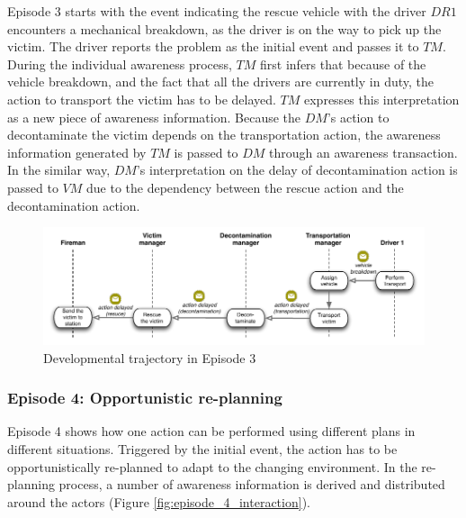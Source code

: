 Episode 3 starts with the event indicating the rescue vehicle with the driver $DR1$ encounters a mechanical breakdown, as the driver is on the way to pick up the victim. The driver reports the problem as the initial event and passes it to $TM$. During the individual awareness process, $TM$ first infers that because of the vehicle breakdown, and the fact that all the drivers are currently in duty, the action to transport the victim has to be delayed. $TM$ expresses this interpretation as a new piece of awareness information. Because the $DM$'s action to decontaminate the victim depends on the transportation action, the awareness information generated by $TM$ is passed to $DM$ through an awareness transaction. In the similar way, $DM$'s interpretation on the delay of decontamination action is passed to $VM$ due to the dependency between the rescue action and the decontamination action. 

\begin{figure}[htbp] %
   \centering
   \includegraphics[width=5.8in]{episode_3_interaction.pdf} 
   \caption{Developmental trajectory in Episode 3}
   \label{fig:episode_3_interaction}
\end{figure}

\subsubsection{Episode 4: Opportunistic re-planning} %
\label{ssub:episode_4_opportunistic_re_planning}
Episode 4 shows how one action can be performed using different plans in different situations. Triggered by the initial event, the action has to be opportunistically re-planned to adapt to the changing environment. In the re-planning process, a number of awareness information is derived and distributed around the actors (Figure \ref{fig:episode_4_interaction}).

